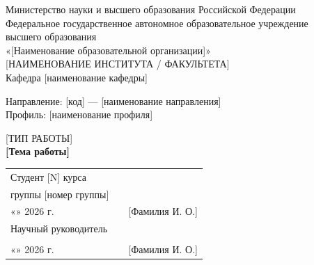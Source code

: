 \documentclass[14pt, a4paper]{extarticle}
\begin{document}
\begin{titlepage}
	\begin{center}
		Министерство науки и высшего образования Российской Федерации\\[0.5ex]
		Федеральное государственное автономное образовательное учреждение\\
		высшего образования\\[0.5ex]
		«[Наименование образовательной организации]»\\[1ex]
		[НАИМЕНОВАНИЕ ИНСТИТУТА / ФАКУЛЬТЕТА]\\[0.5ex]
		Кафедра [наименование кафедры]
	\end{center}

	\vfill

	\begin{center}
		Направление: [код] --- [наименование направления]\\[1ex]
		Профиль: [наименование профиля]
	\end{center}

	\vfill

	\begin{center}
		[ТИП РАБОТЫ]\\[1.5ex]
		\textbf{[Тема работы]}
	\end{center}

	\vfill

	\noindent
	\begin{tabular}{@{}p{} >{\centering\arraybackslash}p{} l@{}}
		Студент [N] курса                                          &                            &                  \\
		группы [номер группы]                                       &                            &                  \\
		«\underline{\hspace{1cm}}» \underline{\hspace{2cm}} 2026 г. & \underline{\hspace{3.5cm}} & [Фамилия И. О.]   \\[0.4cm]

		Научный руководитель                                        &                            &                  \\
		[должность]                                                 &                            &                  \\
		«\underline{\hspace{1cm}}» \underline{\hspace{2cm}} 2026 г. & \underline{\hspace{3.5cm}} & [Фамилия И. О.]   \\[0.4cm]


\end{tabular}
\end{titlepage}
\end{document}
